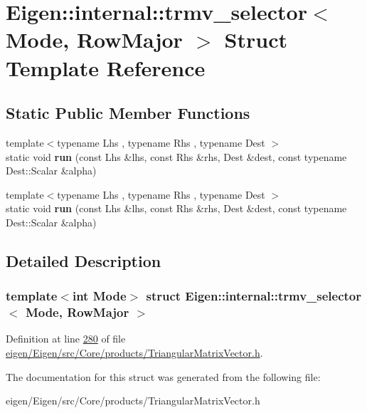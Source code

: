 \hypertarget{struct_eigen_1_1internal_1_1trmv__selector_3_01_mode_00_01_row_major_01_4}{}\section{Eigen\+:\+:internal\+:\+:trmv\+\_\+selector$<$ Mode, Row\+Major $>$ Struct Template Reference}
\label{struct_eigen_1_1internal_1_1trmv__selector_3_01_mode_00_01_row_major_01_4}
\subsection*{Static Public Member Functions}
\begin{DoxyCompactItemize}
\item 
\mbox{\label{struct_eigen_1_1internal_1_1trmv__selector_3_01_mode_00_01_row_major_01_4_ac1d7f5899a6fae8d9d41dc1f92a35825}} 
{\footnotesize template$<$typename Lhs , typename Rhs , typename Dest $>$ }\\static void {\bfseries run} (const Lhs \&lhs, const Rhs \&rhs, Dest \&dest, const typename Dest\+::\+Scalar \&alpha)
\item 
\mbox{\label{struct_eigen_1_1internal_1_1trmv__selector_3_01_mode_00_01_row_major_01_4_ac1d7f5899a6fae8d9d41dc1f92a35825}} 
{\footnotesize template$<$typename Lhs , typename Rhs , typename Dest $>$ }\\static void {\bfseries run} (const Lhs \&lhs, const Rhs \&rhs, Dest \&dest, const typename Dest\+::\+Scalar \&alpha)
\end{DoxyCompactItemize}


\subsection{Detailed Description}
\subsubsection*{template$<$int Mode$>$\newline
struct Eigen\+::internal\+::trmv\+\_\+selector$<$ Mode, Row\+Major $>$}



Definition at line \hyperlink{eigen_2_eigen_2src_2_core_2products_2_triangular_matrix_vector_8h_source_l00280}{280} of file \hyperlink{eigen_2_eigen_2src_2_core_2products_2_triangular_matrix_vector_8h_source}{eigen/\+Eigen/src/\+Core/products/\+Triangular\+Matrix\+Vector.\+h}.



The documentation for this struct was generated from the following file\+:\begin{DoxyCompactItemize}
\item 
eigen/\+Eigen/src/\+Core/products/\+Triangular\+Matrix\+Vector.\+h\end{DoxyCompactItemize}
